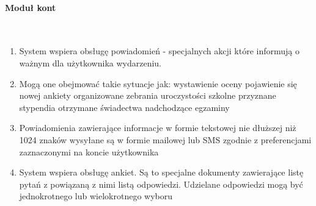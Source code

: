 \documentclass{article}
\begin{document}
\paragraph{Moduł kont} \mbox{}\\
\begin{enumerate}
	\item System wspiera obsługę powiadomień - specjalnych akcji które informują o ważnym dla użytkownika wydarzeniu. \item Mogą one obejmować takie sytuacje jak:
	\subitem wystawienie oceny
	\subitem pojawienie się nowej ankiety
	\subitem organizowane zebrania
	\subitem uroczystości szkolne
	\subitem przyznane stypendia
	\subitem otrzymane świadectwa
	\subitem nadchodzące egzaminy
	\item Powiadomienia zawierające informacje w formie tekstowej nie dłuższej niż 1024 znaków wysyłane są w formie mailowej lub SMS zgodnie z preferencjami zaznaczonymi na koncie użytkownika
	\item System wspiera obsługę ankiet. Są to specjalne dokumenty zawierające listę pytań z powiązaną z nimi listą odpowiedzi. Udzielane odpowiedzi mogą być jednokrotnego lub wielokrotnego wyboru

\end{enumerate}
\end{document}
